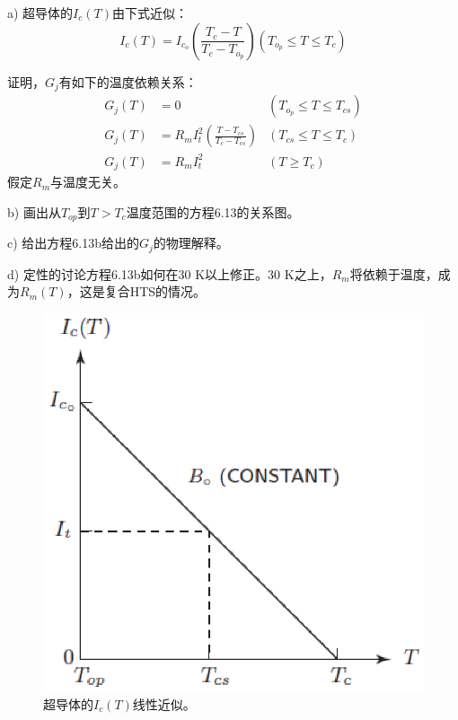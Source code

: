a) 超导体的$I_c(T)$由下式近似：
\begin{equation}%
I_c(T)=I_{c_o}(\frac{T_c-T}{T_c-T_{o_p}}) (T_{o_p}\leq T \leq T_c)
\end{equation}

证明，$G_j$有如下的温度依赖关系：
\begin{subequations}
	\begin{align}
	G_j(T)&=0 &(T_{o_p}\leq T \leq T_{cs})\\
	G_j(T)&=R_mI_t^2(\frac{T-T_{cs}}{T_c-T_{cs}})&(T_{cs}\leq T\leq T_c)\\
	G_j(T)&=R_mI_t^2 &(T\ge T_c)
	\end{align}
\end{subequations}
假定$R_m$与温度无关。

b) 画出从$T_{op}$到$T>T_c$温度范围的方程6.13的关系图。

c) 给出方程6.13b给出的$G_j$的物理解释。

d) 定性的讨论方程6.13b如何在30 K以上修正。30 K之上，$R_m$将依赖于温度，成为$R_m(T)$，这是复合HTS的情况。

\begin{figure}[htbp]
	\centering
	\includegraphics[scale=0.7]{chpt6/figs/fig6.6.eps}
	\caption{超导体的$I_c(T)$线性近似。}
\end{figure}


